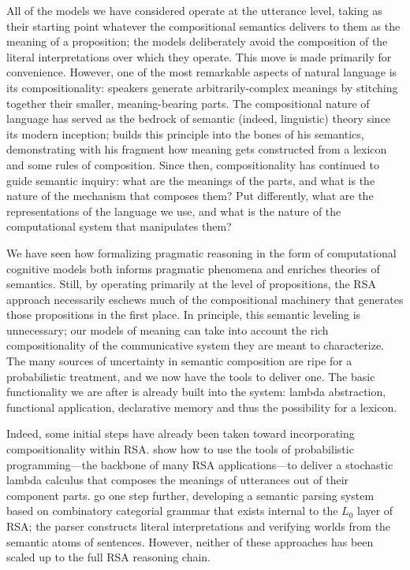 \documentclass{sp}
\begin{document}
All of the models we have considered operate at the utterance level, taking as their starting point whatever the compositional semantics delivers to them as the meaning of a proposition; the models deliberately avoid the composition of the literal interpretations over which they operate. This move is made primarily for convenience. However, one of the most remarkable aspects of natural language is its compositionality: speakers generate arbitrarily-complex meanings by stitching together their smaller, meaning-bearing parts. The compositional nature of language has served as the bedrock of semantic (indeed, linguistic) theory since its modern inception; \cite{montague1973} builds this principle into the bones of his semantics, demonstrating with his fragment how meaning gets constructed from a lexicon and some rules of composition. Since then, compositionality has continued to guide semantic inquiry: what are the meanings of the parts, and what is the nature of the mechanism that composes them? Put differently, what are the representations of the language we use, and what is the nature of the computational system that manipulates them?

We have seen how formalizing pragmatic reasoning in the form of computational cognitive models both informs pragmatic phenomena and enriches theories of semantics. Still, by operating primarily at the level of propositions, the RSA approach necessarily eschews much of the compositional machinery that generates those propositions in the first place. In principle, this semantic leveling is unnecessary; our models of meaning can take into account the rich compositionality of the communicative system they are meant to characterize. The many sources of uncertainty in semantic composition are ripe for a probabilistic treatment, and we now have the tools to deliver one. The basic functionality we are after is already built into the system: lambda abstraction, functional application, declarative memory and thus the possibility for a lexicon.

Indeed, some initial steps have already been taken toward incorporating compositionality within RSA. \cite{goodmanlassiter2015handbook} show how to use the tools of probabilistic programming---the backbone of many RSA applications---to deliver a stochastic lambda calculus that composes the meanings of utterances out of their component parts. \cite{goodmanstuhlmuller2014} go one step further, developing a semantic parsing system based on combinatory categorial grammar that exists internal to the $L_0$ layer of RSA; the parser constructs literal interpretations and verifying worlds from the semantic atoms of sentences. However, neither of these approaches has been scaled up to the full RSA reasoning chain.
\end{document}
